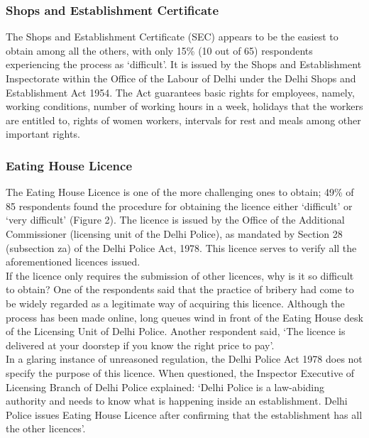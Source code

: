 \documentclass[a4paper, 12pt, twoside]{article}
\begin{document}
                   \subsubsection{Shops and Establishment Certificate}
                   The Shops and Establishment Certificate (SEC) appears to be the easiest to obtain among all the others, with only 15\% (10 out of 65) respondents experiencing the process as ‘difficult’. It is issued by the Shops and Establishment Inspectorate within the Office of the Labour of Delhi under the Delhi Shops and Establishment Act 1954. The Act guarantees basic rights for employees, namely, working conditions, number of working hours in a week, holidays that the workers are entitled to, rights of women workers, intervals for rest and meals among other important rights.
         
                   \subsubsection{Eating House Licence}
                   The Eating House Licence is one of the more challenging ones to obtain; 49\% of 85 respondents found the procedure for obtaining the licence either ‘difficult’ or ‘very difficult’ (Figure 2). The licence is issued by the Office of the Additional Commissioner (licensing unit of the Delhi Police), as mandated by Section 28 (subsection za) of the Delhi Police Act, 1978. This licence serves to verify all the aforementioned licences issued.\\
                   
                   If the licence only requires the submission of other licences, why is it so difficult to obtain? One of the respondents said that the practice of bribery had come to be widely regarded as a legitimate way of acquiring this licence. Although the process has 
been made online, long queues wind in front of the Eating House desk of the Licensing Unit of Delhi Police. Another respondent said, ‘The licence is delivered at your doorstep if you know the right price to pay’.\\
                   
                   In a glaring instance of unreasoned regulation, the Delhi Police Act 1978 does not specify the purpose of this licence. When questioned, the Inspector Executive of Licensing Branch of Delhi Police explained: ‘Delhi Police is a law-abiding authority and 
needs to know what is happening inside an establishment. Delhi Police issues Eating House Licence after confirming that the establishment has all the other licences’.\\
                   
\end{document}
